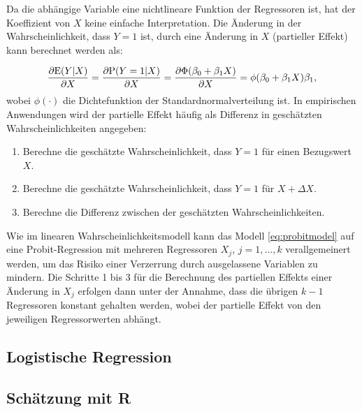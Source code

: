 \documentclass[
  a4paper,
  DIV=11,
  oneside]{scrreprt}
\providecommand{\tightlist}{%
  \setlength{\itemsep}{0pt}\setlength{\parskip}{0pt}}\usepackage{longtable,booktabs,array}
\begin{document}
Da die abhängige Variable eine nichtlineare Funktion der Regressoren
ist, hat der Koeffizient von \(X\) keine einfache Interpretation. Die
Änderung in der Wahrscheinlichkeit, dass \(Y=1\) ist, durch eine
Änderung in \(X\) (partieller Effekt) kann berechnet werden als:

\begin{align}
  \frac{\partial\textup{E}(Y\vert X)}{\partial X} = \frac{\partial\textup{P}(Y=1\vert X)}{\partial X} = \frac{\partial\Phi(\beta_0 + \beta_1 X)}{\partial X} = \phi(\beta_0 + \beta_1 X) \beta_1,
\end{align} wobei \(\phi(\cdot)\) die Dichtefunktion der
Standardnormalverteilung ist. In empirischen Anwendungen wird der
partielle Effekt häufig als Differenz in geschätzten
Wahrscheinlichkeiten angegeben:

\begin{enumerate}
\def\labelenumi{\arabic{enumi}.}
\tightlist
\item
  Berechne die geschätzte Wahrscheinlichkeit, dass \(Y=1\) für einen
  Bezugswert \(X\).
\item
  Berechne die geschätzte Wahrscheinlichkeit, dass \(Y=1\) für
  \(X + \Delta X\).
\item
  Berechne die Differenz zwischen der geschätzten Wahrscheinlichkeiten.
\end{enumerate}

Wie im linearen Wahrscheinlichkeitsmodell kann das Modell
\eqref{eq:probitmodel} auf eine Probit-Regression mit mehreren
Regressoren \(X_j\), \(j=1,\dots,k\) verallgemeinert werden, um das
Risiko einer Verzerrung durch ausgelassene Variablen zu mindern. Die
Schritte 1 bis 3 für die Berechnung des partiellen Effekts einer
Änderung in \(X_j\) erfolgen dann unter der Annahme, dass die übrigen
\(k-1\) Regressoren konstant gehalten werden, wobei der partielle Effekt
von den jeweiligen Regressorwerten abhängt.

\subsection{Logistische Regression}\label{logistische-regression}

\subsection{Schätzung mit R}\label{schuxe4tzung-mit-r}
\end{document}
